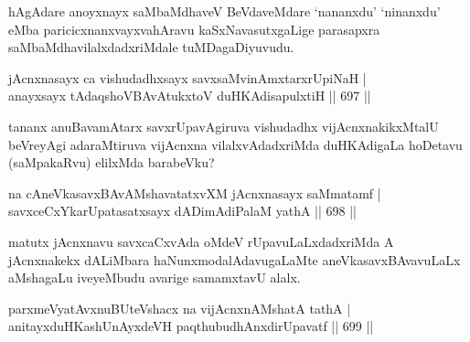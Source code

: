 \begin{artha}
hAgAdare anoyxnayx saMbaMdhaveV BeVdaveMdare `nananxdu' `ninanxdu' eMba paricicxnanxvayxvahAravu kaSxNavasutxgaLige parasapxra saMbaMdhavilalxdadxriMdale tuMDagaDiyuvudu.
\end{artha}


\begin{shl}
\footnotemark[1]jAcnxnasayx ca vishudadhxsayx savxsaMvinAmxtarxrUpiNaH | \\
anayxsayx tAdaqshoV\s BAvAtukxtoV duHKAdisapulxtiH \hfill||  697 ||  
\end{shl}

\begin{artha}
tananx anuBavamAtarx savxrUpavAgiruva vishudadhx vijAcnxnakikxMtalU beVreyAgi adaraMtiruva vijAcnxna vilalxvAdadxriMda duHKAdigaLa hoDetavu (saMpakaRvu) elilxMda barabeVku?
\end{artha}

\begin{shl}
na cAneVkasavxBAvAMshavatatxvXM jAcnxnasayx saMmatamf | \\
savxceCxYkarUpatasatxsayx dADimAdiPalaM yathA \hfill||  698 ||  
\end{shl}

\begin{artha}
matutx jAcnxnavu savxcaCxvAda oMdeV rUpavuLaLxdadxriMda A jAcnxnakekx dALiMbara haNunxmodalAdavugaLaMte aneVkasavxBAvavuLaLx aMshagaLu iveyeMbudu avarige samamxtavU alalx.
\end{artha}

\begin{shl}
\footnotemark[2]parxmeVyatAvxnuBUteVshacx na vijAcnxnAMshatA tathA | \\
anitayxduHKashUnAyxdeVH paqthubudhAnxdirUpavatf \hfill||  699 ||  
\end{shl}

